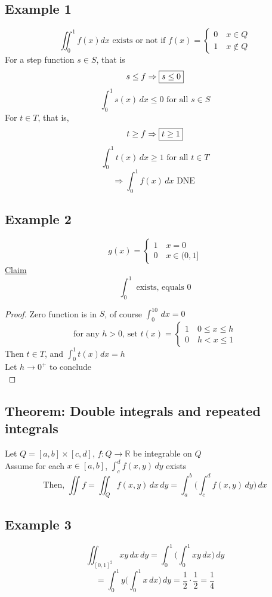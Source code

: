 \documentclass[12pt]{article}
\newcommand*\circled[1]{\tikz[baseline=(char.base)]{
    \node[shape=circle,draw,inner sep=2pt] (char) {#1};}}
\newcommand{\BR}{\mathbb R}
\begin{document}
\subsection*{Example 1}
\[
  \iint_0^1f(x)dx \text{ exists or not if } f(x)=
  \begin{cases}
    0\quad x\in Q \\
    1\quad x\notin Q
  \end{cases}
\]
\circled{1} For a step function $s\in S$, that is \\
\[ s\leq f\Rightarrow\fbox{$s\leq 0$} \]
\[ \int_0^1s(x)\,dx\leq 0\text{ for all }s\in S \]
\circled{2} For $t\in T$, that is, \\
\[ t\geq f\Rightarrow\fbox{$t\geq 1$} \]
\[ \int_0^1t(x)\,dx\geq 1\text{ for all } t\in T \]
\[ \Rightarrow \int_0^1f(x)\,dx \text{ DNE } \]
\subsection*{Example 2}
\[
  g(x) =
  \begin{cases}
    1\quad x=0 \\
    0\quad x\in(0,1]
  \end{cases}
\]
\underline{Claim} \\
\[ \int_0^1\text{ exists, equals }0 \]
\begin{proof}
  Zero function is in $S$, of course $\int_0^10\,dx=0$ \\
  \[
    \text{for any }h>0\text{, set }t(x)=
    \begin{cases}
      1\quad 0\leq x\leq h \\
      0\quad h<x\leq 1
    \end{cases}
  \]
  Then $t\in T$, and $\int_0^1t(x)dx=h$ \\
  Let $h\rightarrow 0^+$ to conclude \\
\end{proof}
\subsection*{Theorem: Double integrals and repeated integrals}
Let $Q=[a,b]\times[c,d]$, $f:Q\rightarrow\BR$ be integrable on $Q$ \\
Assume for each $x\in[a,b]$, $\int_c^df(x,y)\,dy$ exists \\
\[ \text{Then, }\iint f=\iint_Qf(x,y)\,dx\,dy=\int_a^b\Big(\int_c^df(x,y)\,dy\Big)\,dx \]
\subsection*{Example 3}
\[ \iint_{[0,1]^2}xy\,dx\,dy=\int_0^1\Big(\int_0^1xy\,dx\Big)\,dy \]
\[ = \int_0^1y\Big(\int_0^1x\,dx\Big)\,dy=\frac{1}{2}\cdot\frac{1}{2}=\frac{1}{4} \]
\end{document}
